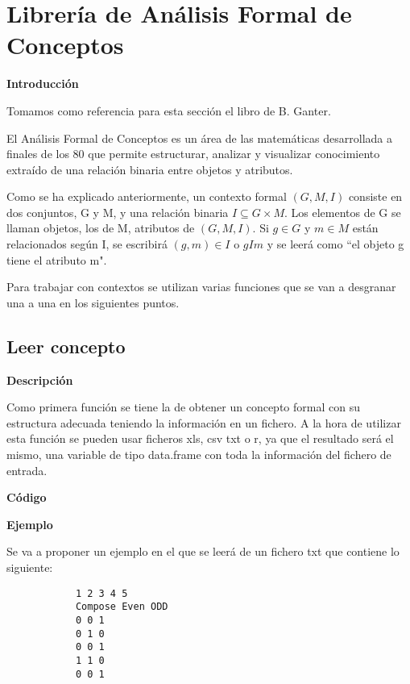 \section{Librer\'ia de An\'alisis Formal de Conceptos}

\textbf{Introducci\'on}

Tomamos como referencia para esta secci\'on el libro de B. Ganter\cite{ganter}.

El An\'alisis Formal de Conceptos es un \'area de las matem\'aticas desarrollada 
a finales de los 80 que permite estructurar, analizar y visualizar conocimiento extra\'ido de una relaci\'on 
binaria entre objetos y atributos.

Como se ha explicado anteriormente, un contexto formal \( (G, M, I) \) consiste en dos conjuntos, G y M, y una relaci\'on binaria \( I \subseteq G \times M \). Los elementos 
de G se llaman objetos, los de M, atributos de \( (G, M, I) \). Si \(g \in G\) y \( m \in M \) est\'an relacionados seg\'un I, se escribir\'a 
\( (g,m) \in I \) o \( g I m \) y se leer\'a como ``el objeto g tiene el atributo m".

Para trabajar con contextos se utilizan varias funciones que se van a desgranar una a una en los siguientes puntos.

    \subsection{Leer concepto}

        \textbf{Descripci\'on}

        Como primera funci\'on se tiene la de obtener un concepto formal con su estructura adecuada teniendo la informaci\'on en un fichero. A la 
        hora de utilizar esta funci\'on se pueden usar ficheros xls, csv txt o r, ya que el resultado ser\'a el mismo, una variable de tipo data.frame 
        con toda la informaci\'on del fichero de entrada.

        \bigskip

        \textbf{C\'odigo}

        
        \bigskip

        \textbf{Ejemplo}

        Se va a proponer un ejemplo en el que se leer\'a de un fichero txt que contiene lo siguiente:

        \begin{verbatim}
            1 2 3 4 5
            Compose Even ODD
            0 0 1
            0 1 0
            0 0 1
            1 1 0
            0 0 1
        \end{verbatim}

